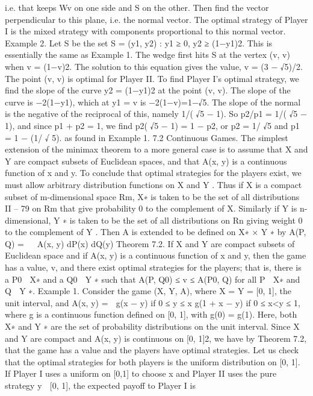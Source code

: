 i.e. that keeps Wv on one side and S on the other. Then find the vector perpendicular to
this plane, i.e. the normal vector. The optimal strategy of Player I is the mixed strategy
with components proportional to this normal vector.
Example 2. Let S be the set S = {(y1, y2) : y1 ≥ 0, y2 ≥ (1−y1)2}. This is essentially
the same as Example 1. The wedge first hits S at the vertex (v, v) when v = (1−v)2. The
solution to this equation gives the value, v = (3 − √5)/2. The point (v, v) is optimal for
Player II. To find Player I’s optimal strategy, we find the slope of the curve y2 = (1−y1)2 at
the point (v, v). The slope of the curve is −2(1−y1), which at y1 = v is −2(1−v)=1−√5.
The slope of the normal is the negative of the reciprocal of this, namely 1/(
√5 − 1). So
p2/p1 = 1/(
√5 − 1), and since p1 + p2 = 1, we find p2(
√5 − 1) = 1 − p2, or p2 = 1/
√5 and
p1 = 1 − (1/
√
5). as found in Example 1.
7.2 Continuous Games. The simplest extension of the minimax theorem to a more
general case is to assume that X and Y are compact subsets of Euclidean spaces, and that
A(x, y) is a continuous function of x and y. To conclude that optimal strategies for the
players exist, we must allow arbitrary distribution functions on X and Y . Thus if X is a
compact subset of m-dimensional space Rm, X∗ is taken to be the set of all distributions
II – 79
on Rm that give probability 0 to the complement of X. Similarly if Y is n-dimensional,
Y ∗ is taken to be the set of all distributions on Rn giving weight 0 to the complement of
Y . Then A is extended to be defined on X∗ × Y ∗ by
A(P, Q) =   A(x, y) dP(x) dQ(y)
Theorem 7.2. If X and Y are compact subsets of Euclidean space and if A(x, y) is a
continuous function of x and y, then the game has a value, v, and there exist optimal
strategies for the players; that is, there is a P0 ∈ X∗ and a Q0 ∈ Y ∗ such that
A(P, Q0) ≤ v ≤ A(P0, Q) for all P ∈ X∗ and Q ∈ Y ∗.
Example 1. Consider the game (X, Y, A), where X = Y = [0, 1], the unit interval,
and
A(x, y) =  g(x − y) if 0 ≤ y ≤ x
g(1 + x − y) if 0 ≤ x<y ≤ 1,
where g is a continuous function defined on [0, 1], with g(0) = g(1). Here, both X∗ and
Y ∗ are the set of probability distributions on the unit interval.
Since X and Y are compact and A(x, y) is continuous on [0, 1]2, we have by Theorem
7.2, that the game has a value and the players have optimal strategies. Let us check that
the optimal strategies for both players is the uniform distribution on [0, 1]. If Player I uses
a uniform on [0,1] to choose x and Player II uses the pure strategy y ∈ [0, 1], the expected
payoff to Player I is
